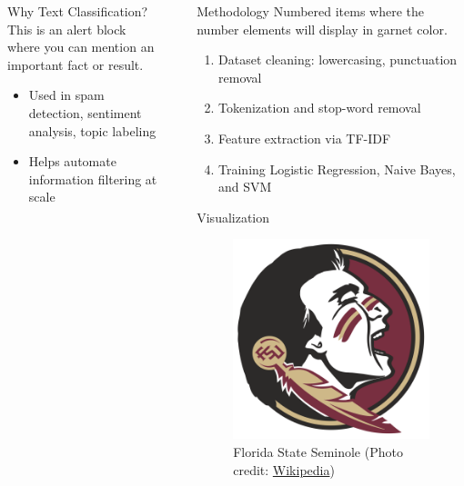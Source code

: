 \documentclass{beamer}
\newlength{\sepwidth}
\newlength{\colwidth}
\newcommand{\separatorcolumn}{\begin{column}{\sepwidth}\end{column}}
\begin{document}
\begin{frame}[t]
\begin{columns}[t]
\begin{column}{\colwidth}
\begin{alertblock}{Why Text Classification?}
This is an alert block where you can mention an important fact or result.
\begin{itemize}
  \item Used in spam detection, sentiment analysis, topic labeling
  \item Helps automate information filtering at scale
\end{itemize}
\end{alertblock}
\end{column}

\separatorcolumn

\begin{column}{\colwidth}
\begin{block}{Methodology}
Numbered items where the number elements will display in garnet color.\hfill
\begin{enumerate}
  \item Dataset cleaning: lowercasing, punctuation removal
  \item Tokenization and stop-word removal
  \item Feature extraction via TF-IDF
  \item Training Logistic Regression, Naive Bayes, and SVM
\end{enumerate}
\end{block}

\begin{block}{Visualization}
\begin{figure}
    \centering
    \includegraphics[width=0.5\linewidth]{images/seminole.png}
    \caption{Florida State Seminole (Photo credit: \href{https://en.wikipedia.org/wiki/Florida_State_Seminoles}{Wikipedia})}
    \label{fig:enter-label}
\end{figure}
\end{block}


\end{column}
\end{columns}
\end{frame}
\end{document}
